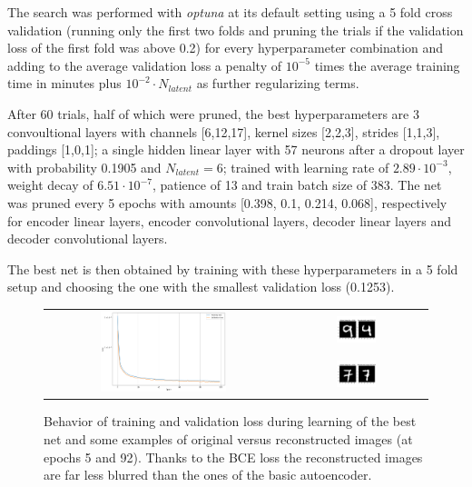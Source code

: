 \documentclass[a4paper, 11pt]{article}
\begin{document}
    The search was performed with \emph{optuna} at its default setting using a 5 fold cross validation (running only the first two folds and pruning the trials if the validation loss of the first fold was above 0.2) for every hyperparameter combination and adding to the average validation loss a penalty of $10^{-5}$ times the average training time in minutes plus $10^{-2} \cdot N_{latent}$ as further regularizing terms.

    After 60 trials, half of which were pruned, the best hyperparameters are 3 convoultional layers with channels [6,12,17], kernel sizes [2,2,3], strides [1,1,3], paddings [1,0,1]; a single hidden linear layer with 57 neurons after a dropout layer with probability 0.1905 and $N_{latent} = 6$; trained with learning rate of $2.89\cdot10^{-3}$, weight decay of $6.51\cdot10^{-7}$, patience of 13 and train batch size of 383. The net was pruned every 5 epochs with amounts [0.398, 0.1, 0.214, 0.068], respectively for encoder linear layers, encoder convolutional layers, decoder linear layers and decoder convolutional layers.

    The best net is then obtained by training with these hyperparameters in a 5 fold setup and choosing the one with the smallest validation loss (0.1253).

    \begin{figure}
      \centering
      \begin{tabular}{cc}
        \multirow{2}{*}[2.4cm]{\includegraphics[width=0.55\textwidth]{img/best_loss.png}}
        & \includegraphics[width=0.3\textwidth]{img/best/epoch_5.png} \\
        & \includegraphics[width=0.3\textwidth]{img/best/epoch_92.png} \\
      \end{tabular}
      \caption{Behavior of training and validation loss during learning of the best net and some examples of original versus reconstructed images (at epochs 5 and 92). Thanks to the BCE loss the reconstructed images are far less blurred than the ones of the basic autoencoder.}
      \label{fig:best}
    \end{figure}
\end{document}
